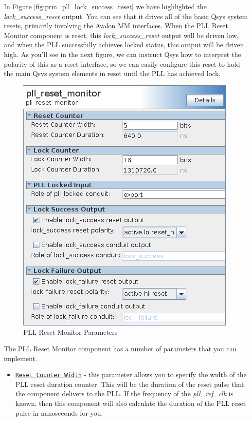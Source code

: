 \documentclass{article}
\begin{document}
\begin{flushleft}
In Figure \ref{fig:prm_pll_lock_success_reset} we have highlighted the \emph{lock\_success\_reset} output.  You can see that it drives all of the basic Qsys system resets, primarily involving the Avalon MM interfaces.  When the PLL Reset Monitor component is reset, this \emph{lock\_success\_reset} output will be driven low, and when the PLL successfully achieves locked status, this output will be driven high.  As you'll see in the next figure, we can instruct Qsys how to interpret the polarity of this as a reset interface, so we can easily configure this reset to hold the main Qsys system elements in reset until the PLL has achieved lock.

\begin{figure}[H]
\centering
\includegraphics[scale=0.675]{prm_parameters}
\caption{PLL Reset Monitor Parameters}
\label{fig:prm_parameters}
\end{figure}

The PLL Reset Monitor component has a number of parameters that you can implement.
\begin{itemize}

\item \texttt{\underline{Reset Counter Width}} - this parameter allows you to specify the width of the PLL reset duration counter.  This will be the duration of the reset pulse that the component delivers to the PLL.  If the frequency of the \emph{pll\_ref\_clk} is known, then this component will also calculate the duration of the PLL reset pulse in nanoseconds for you.


\end{itemize}
\end{flushleft}
\end{document}
